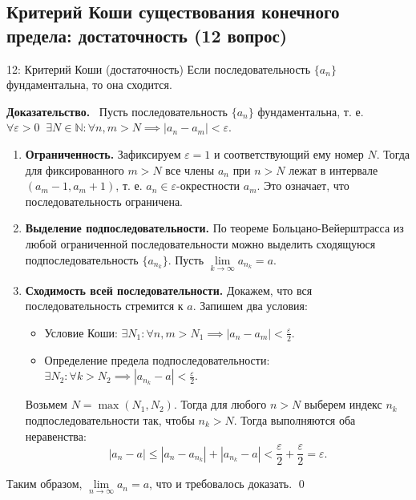 \documentclass[a4paper,12pt]{article}
\newcommand{\myproof}{\textbf{Доказательство.}\ }
\begin{document}
	
	
	\newpage
	\subsection{Критерий Коши существования конечного предела: достаточность (12 вопрос)}
	
	\begin{theorembox}{12: Критерий Коши (достаточность)}
		Если последовательность $\{a_n\}$ фундаментальна, то она сходится.
	\end{theorembox}
	
	\vspace{0.5cm}
	\myproof
	Пусть последовательность $\{a_n\}$ фундаментальна, т. е. $\forall \varepsilon > 0 \;\; \exists N \in \mathbb{N} \colon \forall n, m > N \implies |a_n - a_m| < \varepsilon$.
	
	\begin{enumerate}
		\item \textbf{Ограниченность.} Зафиксируем $\varepsilon = 1$ и соответствующий ему номер $N$. Тогда для фиксированного $m > N$ все члены $a_n$ при $n > N$ лежат в интервале $(a_m - 1, a_m + 1)$, т. е. $a_n \in \varepsilon\text{-окрестности } a_m$. Это означает, что последовательность ограничена.
		
		\item \textbf{Выделение подпоследовательности.} По теореме Больцано-Вейерштрасса из любой ограниченной последовательности можно выделить сходящуюся подпоследовательность $\{a_{n_k}\}$. Пусть $\lim\limits_{k \to \infty} a_{n_k} = a$.
		
		\item \textbf{Сходимость всей последовательности.} Докажем, что вся последовательность стремится к $a$. Запишем два условия:
		\begin{itemize}
			\item Условие Коши: $\exists N_1 \colon \forall n, m > N_1 \implies |a_n - a_m| < \frac{\varepsilon}{2}$.
			\item Определение предела подпоследовательности: $\exists N_2 \colon \forall k > N_2 \implies |a_{n_k} - a| < \frac{\varepsilon}{2}$.
		\end{itemize}
		Возьмем $N = \max(N_1, N_2)$. Тогда для любого $n > N$ выберем индекс $n_k$ подпоследовательности так, чтобы $n_k > N$. Тогда выполняются оба неравенства:
		\[ |a_n - a| \le |a_n - a_{n_k}| + |a_{n_k} - a| < \frac{\varepsilon}{2} + \frac{\varepsilon}{2} = \varepsilon. \]
	\end{enumerate}
	Таким образом, $\lim\limits_{n \to \infty} a_n = a$, что и требовалось доказать. \qed
	
\end{document}
